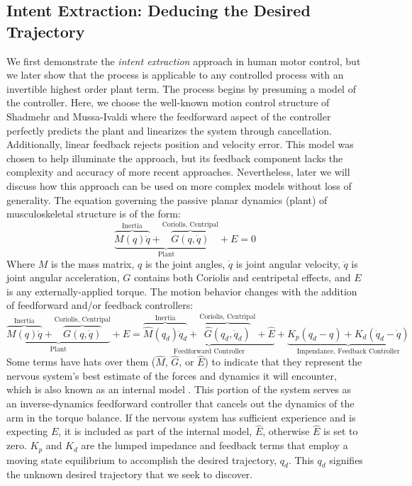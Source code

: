 \documentclass[10pt]{article}
\begin{document}
\subsection*{Intent Extraction: Deducing the Desired Trajectory}
We first demonstrate the \textit{intent extraction} approach in human motor control, but we later show that the process is applicable to any controlled process with an invertible highest order plant term. The process begins by presuming a model of the controller. Here, we choose the well-known motion control structure of Shadmehr and Mussa-Ivaldi\cite{shadmehr1994adaptive} where the feedforward aspect of the controller perfectly predicts the plant and linearizes the system through cancellation. Additionally, linear feedback rejects position and velocity error. This model was chosen to help illuminate the approach, but its feedback component lacks the complexity and accuracy of more recent approaches. Nevertheless, later we will discuss how this approach can be used on more complex models without loss of generality. The equation governing the passive planar dynamics (plant) of musculoskeletal structure is of the form:
\begin{equation}
\underbrace{\overbrace{M(q)\ddot{q}}^{\text{Inertia}}+\overbrace{G(q,\dot{q})}^{\text{Coriolis, Centripal}}}_{\text{Plant}}+E=0
\end{equation}
Where $M$ is the mass matrix, $q$ is the joint angles, $\dot{q}$ is joint angular velocity, $\ddot{q}$ is joint angular acceleration, $G$ contains both Coriolis and centripetal effects, and $E$ is any externally-applied torque. The motion behavior changes with the addition of feedforward and/or feedback controllers:
\begin{equation}
\underbrace{\overbrace{M(q)\ddot{q}}^{\text{Inertia}}+\overbrace{G(q,\dot{q})}^{\text{Coriolis, Centripal}}}_{\text{Plant}}+E=\underbrace{\overbrace{\hat{M}(q_d)\ddot{q}_d}^{\text{Inertia}}+\overbrace{\hat{G}(q_d,\dot{q}_d)}^{\text{Coriolis, Centripal}}+\hat{E}}_{\text{Feedforward Controller}}+\underbrace{K_p(q_d-q)+K_d(\dot{q}_d-\dot{q})}_{\text{Impendance, Feedback Controller}}
\end{equation}
Some terms have hats over them ($\hat{M}$, $\hat{G}$, or $\hat{E}$) to indicate that they represent the nervous system's best estimate of the forces and dynamics it will encounter, which is also known as an internal model \cite{shadmehr1994adaptive}. This portion of the system serves as an inverse-dynamics feedforward controller that cancels out the dynamics of the arm in the torque balance. If the nervous system has sufficient experience and is expecting $E$, it is included as part of the internal model, $\hat{E}$, otherwise $\hat{E}$ is set to zero. $K_p$ and $K_d$ are the lumped impedance and feedback terms that employ a moving state equilibrium to accomplish the desired trajectory, $q_d$. This $q_d$ signifies the unknown desired trajectory that we seek to discover.
\end{document}
